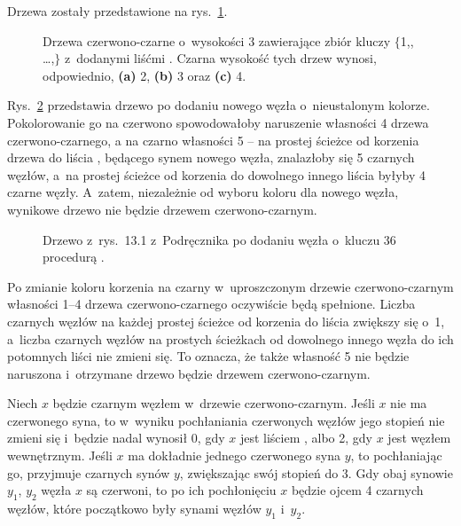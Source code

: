 
\exercise %
Drzewa zostały przedstawione na rys.\ \ref{fig:13.1-1}.
\begin{figure}[!ht]
	\centering 
	\caption{Drzewa czerwono-czarne o~wysokości 3 zawierające zbiór kluczy $\{$1,,\! \dots,$\}$ z~dodanymi liśćmi .
	Czarna wysokość tych drzew wynosi, odpowiednio, {\sffamily\bfseries(a)} 2, {\sffamily\bfseries(b)} 3 oraz {\sffamily\bfseries(c)} 4.} \label{fig:13.1-1}
\end{figure}

\exercise %
Rys.\ \ref{fig:13.1-2} przedstawia drzewo po dodaniu nowego węzła o~nieustalonym kolorze.
Pokolorowanie go na czerwono spowodowałoby naruszenie własności 4 drzewa czerwono-czarnego, a na czarno własności 5 -- na prostej ścieżce od korzenia drzewa do liścia , będącego synem nowego węzła, znalazłoby się 5 czarnych węzłów, a~na prostej ścieżce od korzenia do dowolnego innego liścia  byłyby 4 czarne węzły.
A~zatem, niezależnie od wyboru koloru dla nowego węzła, wynikowe drzewo nie będzie drzewem czerwono-czarnym.
\begin{figure}[!ht]
	\centering 
	\caption{Drzewo z~rys.\ 13.1 z~Podręcznika po dodaniu węzła o~kluczu 36 procedurą .} \label{fig:13.1-2}
\end{figure}

\exercise %
Po zmianie koloru korzenia na czarny w~uproszczonym drzewie czerwono-czarnym własności 1--4 drzewa czerwono-czarnego oczywiście będą spełnione.
Liczba czarnych węzłów na każdej prostej ścieżce od korzenia do liścia zwiększy się o~1, a~liczba czarnych węzłów na prostych ścieżkach od dowolnego innego węzła do ich potomnych liści nie zmieni się.
To oznacza, że także własność 5 nie będzie naruszona i~otrzymane drzewo będzie drzewem czerwono-czarnym.

\exercise %
Niech $x$ będzie czarnym węzłem w~drzewie czerwono-czarnym.
Jeśli $x$ nie ma czerwonego syna, to w~wyniku pochłaniania czerwonych węzłów jego stopień nie zmieni się i~będzie nadal wynosił 0, gdy $x$ jest liściem , albo 2, gdy $x$ jest węzłem wewnętrznym.
Jeśli $x$ ma dokładnie jednego czerwonego syna $y$, to pochłaniając go, przyjmuje czarnych synów $y$, zwiększając swój stopień do 3.
Gdy obaj synowie $y_1$, $y_2$ węzła $x$ są czerwoni, to po ich pochłonięciu $x$ będzie ojcem 4 czarnych węzłów, które początkowo były synami węzłów $y_1$ i~$y_2$.

